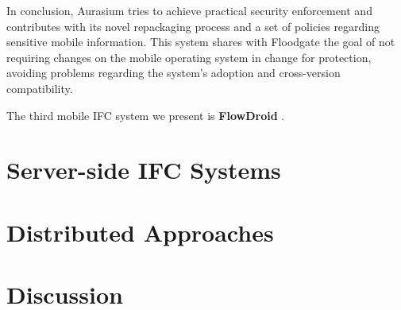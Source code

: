 In conclusion, Aurasium tries to achieve practical security enforcement and contributes with its novel repackaging process and a set of policies regarding sensitive mobile information. This system shares with Floodgate the goal of not requiring changes on the mobile operating system in change for protection, avoiding problems regarding the system's adoption and cross-version compatibility.

The third mobile IFC system we present is \textbf{FlowDroid} \cite{flowdroid}.

\section{Server-side IFC Systems}
\label{sec:server-ifc-systems}

\section{Distributed Approaches}
\label{sec:distributed-ifc-systems}

\section{Discussion}
\label{sec:related-work-discussion}
 
 
